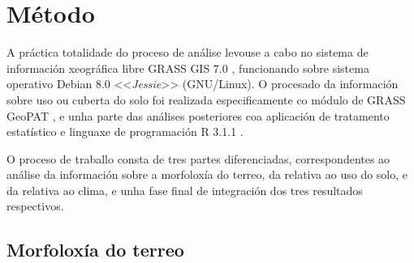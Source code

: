 \documentclass[11pt,a4paper]{article}
\begin{document}





\section{Método}

A práctica totalidade do proceso de análise levouse a cabo no sistema de información xeográfica libre GRASS GIS 7.0 \citep{GRASS7}, funcionando sobre sistema operativo Debian 8.0 <<\emph{Jessie}>> (GNU/Linux). O procesado da información sobre uso ou cuberta do solo foi realizada especificamente co módulo de GRASS GeoPAT \citep[\emph{Geospatial Pattern Analysis Toolbox},][]{Jasiewicz201562}, e unha parte das análises posteriores coa aplicación de tratamento estatístico e linguaxe de programación R 3.1.1 \citep{R}.%

O proceso de traballo consta de tres partes diferenciadas, correspondentes ao análise da información sobre a morfoloxía do terreo, da relativa ao uso do solo, e da relativa ao clima, e unha fase final de integración dos tres resultados respectivos.

\subsection{Morfoloxía do terreo}
\end{document}
